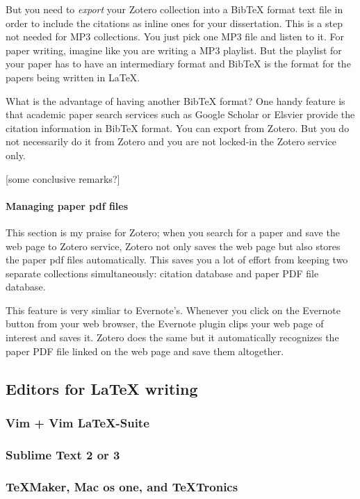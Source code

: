 \documentclass[11pt]{article}
\begin{document}
But you need to \emph{export} your Zotero collection into a BibTeX format
text file in order to include the citations as inline ones for your
dissertation. This is a step not needed for MP3 collections. You just pick one
MP3 file and listen to it. For paper writing, imagine like you are writing a
MP3 playlist. But the playlist for your paper has to have an intermediary
format and BibTeX is the format for the papers being written in LaTeX.

What is the advantage of having another BibTeX format? One handy feature is
that academic paper search services such as Google Scholar or Elsvier provide
the citation information in BibTeX format. You can export from Zotero. But you
do not necessarily do it from Zotero and you are not locked-in the Zotero
service only. 

[some conclusive remarks?]

\paragraph{Managing paper pdf files}
This section is my praise for Zotero; when you search for a paper and
save the web page to Zotero service, Zotero not only saves the web page
but also stores the paper pdf files automatically. This saves you a lot
of effort from keeping two separate collections simultaneously: citation
database and paper PDF file database.

This feature is very simliar to Evernote's. Whenever you click on the Evernote
button from your web browser, the Evernote plugin clips your web page of
interest and saves it. Zotero does the same but it automatically recognizes
the paper PDF file linked on the web page and save them altogether.

\subsection{Editors for LaTeX writing}

\subsubsection{Vim + Vim LaTeX-Suite}

\subsubsection{Sublime Text 2 or 3}

\subsubsection{TeXMaker, Mac os one, and TeXTronics}
\end{document}
